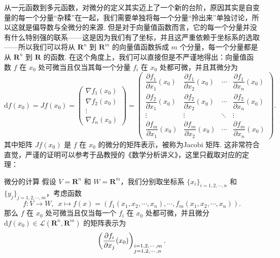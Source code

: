 从一元函数到多元函数，对微分的定义其实迈上了一个新的台阶，原因其实是自变量的每一个分量“杂糅”在一起，我们需要单独将每一个分量“拎出来”单独讨论，所以这就是偏导数与全微分的来源. 但是对于向量值函数而言，它的每一个分量并没有什么特别强的联系——这是因为我们有了坐标，并且这严重依赖于坐标系的选取——所以我们可以将从 $\mathbf{R}^n$ 到 $\mathbf{R}^m$ 的向量值函数拆成 $m$ 个分量，每一个分量都是从 $\mathbf{R}^n$ 到 $\mathbf{R}$ 的函数. 在这个角度上，我们可以直接但是不严谨地得出：向量值函数 $f$ 在 $x_0$ 处可微当且仅当其每一个分量 $f_i$ 在 $x_0$ 处都可微，并且其微分为
\[
    \mathrm{d}f(x_0) = Jf(x_0) =
    \begin{pmatrix} \nabla f_1(x_0) \\ \nabla f_2(x_0) \\ \vdots \\ \nabla f_n(x_0) \end{pmatrix} =
    \begin{pmatrix}
        \dfrac{\partial f_1}{\partial x_1}(x_0) &\dfrac{\partial f_1}{\partial x_2}(x_0) & \cdots & \dfrac{\partial f_1}{\partial x_n}(x_0) \\
        \dfrac{\partial f_2}{\partial x_1}(x_0) & \dfrac{\partial f_2}{\partial x_2}(x_0) & \cdots & \dfrac{\partial f_2}{\partial x_n}(x_0) \\
        \vdots & \vdots & \ddots & \vdots \\
        \dfrac{\partial f_m}{\partial x_1}(x_0) & \dfrac{\partial f_m}{\partial x_2}(x_0) & \cdots & \dfrac{\partial f_m}{\partial x_n}(x_0)
    \end{pmatrix}.
\]
其中矩阵 $Jf(x_0)$ 是 $f$ 在 $x_0$ 的微分的矩阵表示，被称为\textrm{Jacobi 矩阵}. 这非常符合直觉，严谨的证明可以参考于品教授的《数学分析讲义》，这里只截取对应的定理：

\begin{theorem}{微分的计算}{}
    假设 $V = \mathbf{R}^n$ 和 $W = \mathbf{R}^m$，我们分别取坐标系 $\{x_i\}_{i = 1, 2, \cdots, n}$ 和 $\{y_j\}_{j = 1, 2, \cdots, m}$，考虑函数 \[f: V\to W,\enspace x\mapsto f(x) = (f_1(x_1, x_2, \cdots, x_n), \cdots, f_m(x_1, x_2, \cdots, x_n)).\]
    那么 $f$ 在 $x_0$ 处可微当且仅当每一个 $f_i$ 在 $x_0$ 处都可微，并且微分 $\mathrm{d}f(x_0)\in \mathcal{L}(\mathbf{R}^n, \mathbf{R}^m)$ 的矩阵表示为
    \[\left(\frac{\partial f_i}{\partial x_j}(x_0)\right)_{\begin{subarray}  \enspace i = 1, 2, \cdots, m \\ j = 1, 2, \cdots, n\end{subarray}}.\]
\end{theorem}

